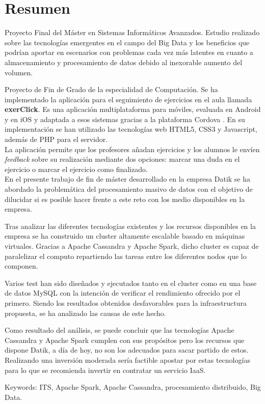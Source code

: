 \section*{Resumen}

Proyecto Final del Máster en Sistemas Informáticos Avanzados. Estudio realizado sobre las tecnologías emergentes en el campo del Big Data y los beneficios que podrían aportar en escenarios con problemas cada vez más latentes en cuanto a almacenamiento y procesamiento de datos debido al inexorable aumento del volumen.




Proyecto de Fin de Grado de la especialidad de Computación. Se ha implementado la aplicación para el seguimiento de ejercicios en el aula llamada \textbf{exerClick}. Es una aplicación multiplataforma para móviles, evaluada en Android y en iOS y adaptada a esos sistemas gracias a la plataforma Cordova \cite{apachecordova}. En su implementación se han utilizado las tecnologías web HTML5, CSS3 y Javascript, además de PHP para el servidor.\\

La aplicación permite que los profesores añadan ejercicios y los alumnos le envíen \textit{feedback} sobre su realización mediante dos opciones: marcar una duda en el ejercicio o marcar el ejercicio como finalizado.\\

En el presente trabajo de fin de máster desarrollado en la empresa Datik se ha abordado la problemática del procesamiento masivo de datos con el objetivo de dilucidar si es posible hacer frente a este reto con los medio disponibles en la empresa.

Tras analizar las diferentes tecnologías existentes y los recursos disponibles en la empresa se ha construido un cluster altamente escalable basado en máquinas virtuales. Gracias a Apache Cassandra y Apache Spark, dicho cluster es capaz de paralelizar el computo repartiendo las tareas entre los diferentes nodos que lo componen. 

Varios test han sido diseñados y ejecutados tanto en el cluster como en una base de datos MySQL con la intención de verificar el rendimiento ofrecido por el primero. Siendo los resultados obtenidos desfavorables para la infraestructura propuesta, se ha analizado las causas de este hecho. 

Como resultado del análisis, se puede concluir que las tecnologías Apache Cassandra y Apache Spark cumplen con sus propósitos pero los recursos que dispone Datik, a día de hoy, no son los adecuados para sacar partido de estos. Realizando una inversión moderada sería factible apostar por estas tecnologías para lo que se recomienda invertir en contratar un servicio IaaS.

Keywords: ITS, Apache Spark, Apache Cassandra, procesamiento distribuido, Big Data.
